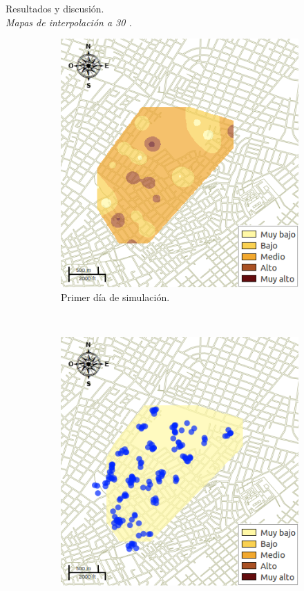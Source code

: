 \begin{frame}[t]{Resultados y discusión.\\\textit{Mapas de interpolación a 30 \textcelsius.}}
    \begin{figure}
    \begin{subfigure}[b]{0.45\textwidth}
        \includegraphics[width=\textwidth]{../book/capitulo-6/graphics/raster/temp-30-0.png}
        \caption{ Primer día de simulación.}
    \end{subfigure}
    ~~~~
    \begin{subfigure}[b]{0.45\textwidth}
        \includegraphics[width=\textwidth]{../book/capitulo-6/graphics/raster/temp-30-9.png}

\end{subfigure}
\end{figure}
\end{frame}
